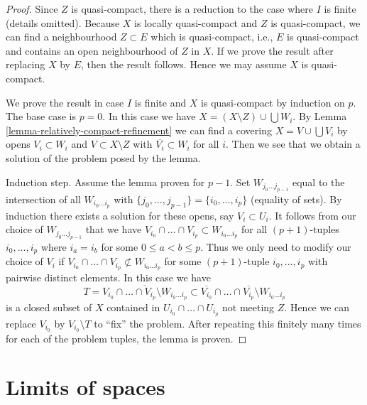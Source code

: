 \begin{proof}
Since $Z$ is quasi-compact, there is a reduction to the
case where $I$ is finite (details omitted).
Because $X$ is locally quasi-compact and $Z$ is quasi-compact,
we can find a neighbourhood $Z \subset E$ which is quasi-compact,
i.e., $E$ is quasi-compact and contains an open neighbourhood
of $Z$ in $X$. If we prove the result after replacing $X$ by $E$,
then the result follows. Hence we may assume $X$ is quasi-compact.

\medskip\noindent
We prove the result in case $I$ is finite and $X$ is quasi-compact
by induction on $p$. The base case is $p = 0$. In this case we have
$X = (X \setminus Z) \cup \bigcup W_i$. By
Lemma \ref{lemma-relatively-compact-refinement}
we can find a covering $X = V \cup \bigcup V_i$ by
opens $V_i \subset W_i$ and $V \subset X \setminus Z$
with $\overline{V_i} \subset W_i$ for all $i$. Then we see that
we obtain a solution of the problem posed by the lemma.

\medskip\noindent
Induction step. Assume the lemma proven for $p - 1$.
Set $W_{j_0 \ldots j_{p - 1}}$ equal to the intersection of
all $W_{i_0 \ldots i_p}$ with
$\{j_0, \ldots, j_{p - 1}\} = \{i_0, \ldots, i_p\}$ (equality of sets).
By induction there exists a solution for these opens, say
$V_i \subset U_i$.
It follows from our choice of $W_{j_0 \ldots j_{p - 1}}$ that we have
$V_{i_0} \cap \ldots \cap V_{i_p} \subset W_{i_0 \ldots i_p}$
for all $(p + 1)$-tuples $i_0, \ldots, i_p$ where $i_a = i_b$ for
some $0 \leq a < b \leq p$.
Thus we only need to modify our choice of
$V_i$ if $V_{i_0} \cap \ldots \cap V_{i_p} \not \subset W_{i_0 \ldots i_p}$
for some $(p + 1)$-tuple $i_0, \ldots, i_p$ with pairwise distinct elements.
In this case we have
$$
T =
\overline{V_{i_0} \cap \ldots \cap V_{i_p} \setminus W_{i_0 \ldots i_p}}
\subset 
\overline{V_{i_0}} \cap \ldots \cap \overline{V_{i_p}} \setminus
W_{i_0 \ldots i_p}
$$
is a closed subset of $X$ contained in $U_{i_0} \cap \ldots \cap U_{i_p}$
not meeting $Z$. Hence we can replace $V_{i_0}$ by $V_{i_0} \setminus T$
to ``fix'' the problem. After repeating this finitely many times for each
of the problem tuples, the lemma is proven.
\end{proof}






\section{Limits of spaces}
\label{section-limits}

